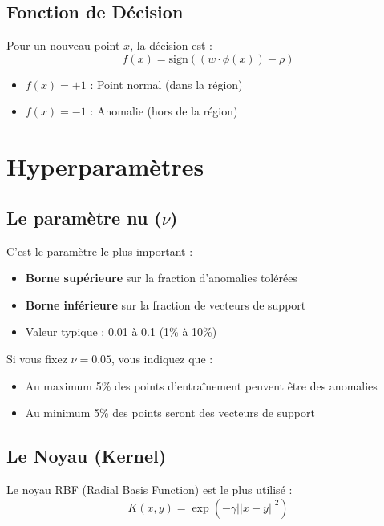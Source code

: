 \documentclass[a4paper,11pt]{article}
\begin{document}
\subsection{Fonction de Décision}

Pour un nouveau point $x$, la décision est :
$$ f(x) = \text{sign}((w \cdot \phi(x)) - \rho) $$

\begin{itemize}
    \item $f(x) = +1$ : Point normal (dans la région)
    \item $f(x) = -1$ : Anomalie (hors de la région)
\end{itemize}

\section{Hyperparamètres}

\subsection{Le paramètre nu ($\nu$)}

C'est le paramètre le plus important :
\begin{itemize}
    \item \textbf{Borne supérieure} sur la fraction d'anomalies tolérées
    \item \textbf{Borne inférieure} sur la fraction de vecteurs de support
    \item Valeur typique : 0.01 à 0.1 (1\% à 10\%)
\end{itemize}

\begin{examplebox}
Si vous fixez $\nu = 0.05$, vous indiquez que :
\begin{itemize}
    \item Au maximum 5\% des points d'entraînement peuvent être des anomalies
    \item Au minimum 5\% des points seront des vecteurs de support
\end{itemize}
\end{examplebox}

\subsection{Le Noyau (Kernel)}

Le noyau RBF (Radial Basis Function) est le plus utilisé :
$$ K(x, y) = \exp\left(-\gamma ||x - y||^2\right) $$
\end{document}
